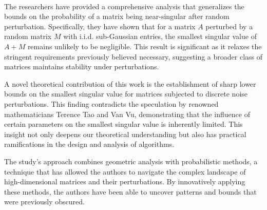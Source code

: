 
~\cite{jain2020smoothed}

The researchers have provided a comprehensive analysis that generalizes
the bounds on the probability of a matrix being near-singular after
random perturbation. Specifically, they have shown that for a matrix
${A}$ perturbed by a random matrix 
${M}$ with i.i.d. sub-Gaussian entries, the smallest singular value
of ${A+M}$ remains unlikely to be negligible. This result is significant
as it relaxes the stringent requirements previously believed necessary,
suggesting a broader class of matrices maintains stability under
perturbations.

A novel theoretical contribution of this work is the establishment 
of sharp lower bounds on the smallest singular value for matrices
subjected to discrete noise perturbations. This finding contradicts
the speculation by renowned mathematicians Terence Tao and Van Vu,
demonstrating that the influence of certain parameters on the smallest
singular value is inherently limited. This insight not only deepens our
theoretical understanding but also has practical ramifications in 
the design and analysis of algorithms.

The study's approach combines geometric
analysis with probabilistic methods, a technique
that has allowed the authors to navigate the complex landscape
of high-dimensional matrices and their perturbations.
By innovatively applying these methods, 
the authors have been able to uncover patterns and bounds
that were previously obscured.

